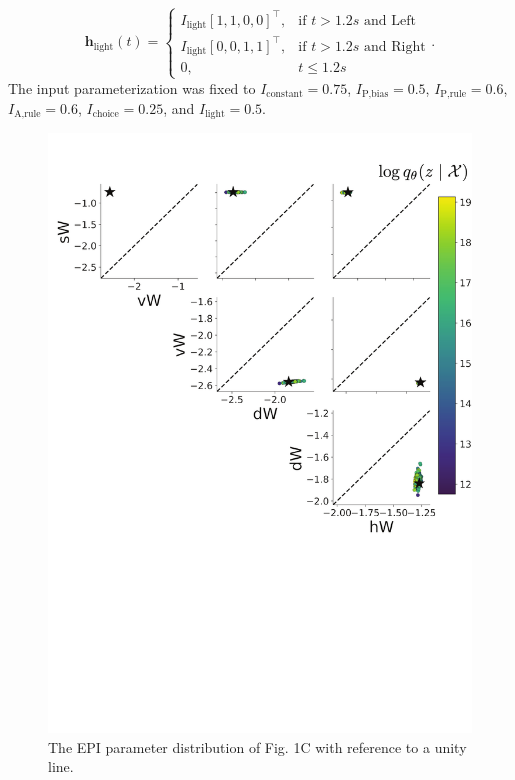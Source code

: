 \documentclass[11pt]{article}
\begin{document}
\begin{equation}  \mathbf{h}_{\text{light}}(t) = \begin{cases}
                           I_{\text{light}} [1, 1, 0, 0]^\top,& \text{if } t > 1.2s \text{ and Left} \\
                           I_{\text{light}} [0, 0, 1, 1]^\top,& \text{if } t > 1.2s \text{ and Right} \\
                            0,              & t \leq 1.2s
                         \end{cases} .
\end{equation}
The input parameterization was fixed to $I_{\text{constant}} = 0.75$, $I_{\text{P,bias}} = 0.5 $, $I_{\text{P,rule}} = 0.6$,  $I_{\text{A,rule}} = 0.6$,  $I_{\text{choice}} = 0.25$,  and $I_{\text{light}} = 0.5$.

\begin{figure}
\begin{center}
\includegraphics[scale=0.6]{figs/figSX5.pdf}
\end{center}
\caption{\small The EPI parameter distribution of Fig. 1C with reference to a unity line.
}
\label{fig:SX5}
\end{figure}
\end{document}

